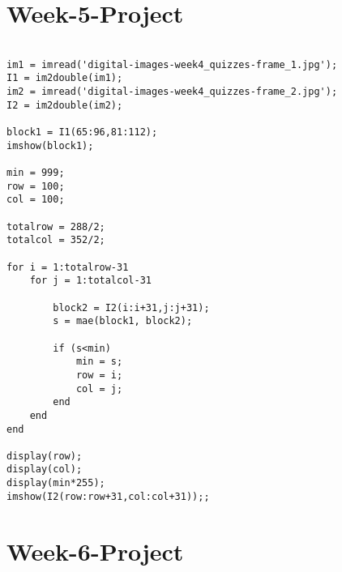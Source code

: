 \documentclass[12 pt]{article}
\begin{document}
 \section{Week-5-Project}
 \begin{lstlisting}
 
im1 = imread('digital-images-week4_quizzes-frame_1.jpg');
I1 = im2double(im1);
im2 = imread('digital-images-week4_quizzes-frame_2.jpg');
I2 = im2double(im2);

block1 = I1(65:96,81:112);
imshow(block1);

min = 999;
row = 100;
col = 100;

totalrow = 288/2;
totalcol = 352/2;

for i = 1:totalrow-31
    for j = 1:totalcol-31

        block2 = I2(i:i+31,j:j+31);
        s = mae(block1, block2);

        if (s<min)
            min = s;
            row = i;
            col = j;   
        end
    end
end

display(row);
display(col);
display(min*255);
imshow(I2(row:row+31,col:col+31));;

 \end{lstlisting}
 



 \newpage
 \section{Week-6-Project}
 
\end{document}
